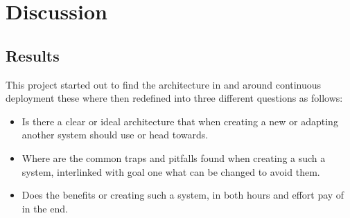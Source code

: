 %
%
%
%
%
%

\section{Discussion}
\label{sec:discussion}

\subsection{Results}

This project started out to find the architecture in and around continuous deployment these where then redefined into three different questions as follows:

\begin{itemize}
  \item Is there a clear or ideal architecture that when creating a new or adapting another system should use or head towards.\\
    \item Where are the common traps and pitfalls found when creating a such a system, interlinked  with goal one what can be changed to avoid them.\\
  \item Does the benefits or creating such a system, in both hours and effort pay of in the end.
\end{itemize}

